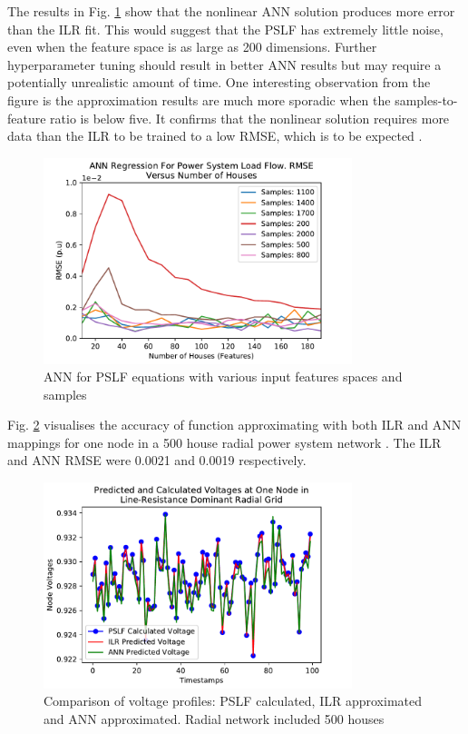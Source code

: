 \documentclass[conference]{IEEEtran}
\begin{document}
The results in Fig. \ref{fig:annresults} show that the nonlinear ANN solution produces more error than the ILR fit. This would suggest that the PSLF has extremely little noise, even when the feature space is as large as 200 dimensions. Further hyperparameter tuning should result in better ANN results but may require a potentially unrealistic amount of time. One interesting observation from the figure is the approximation results are much more sporadic when the samples-to-feature ratio is below five. It confirms that the nonlinear solution requires more data than the ILR to be trained to a low RMSE, which is to be expected \cite{gema1992}.

\begin{figure}[h]
	\centering
	\includegraphics[width=9cm]{annrmsevsfeatures_familyofcurves.pdf}
	\caption{ANN for PSLF equations with various input features spaces and samples}
	\label{fig:annresults}
\end{figure}

Fig. \ref{fig:comparison} visualises the accuracy of function approximating with both ILR and ANN mappings for one node in a 500 house radial power system network	. The ILR and ANN RMSE were 0.0021 and 0.0019 respectively.

\begin{figure}[h]
	\centering
	\includegraphics[width=9cm]{comparingvoltages_500.pdf}
	\caption{Comparison of voltage profiles: PSLF calculated, ILR approximated and ANN approximated. Radial network included 500 houses}
	\label{fig:comparison}
\end{figure}
\end{document}
